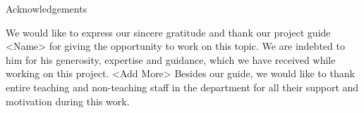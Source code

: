 
\newpage
\thispagestyle{empty}

\begin{center}
\LARGE Acknowledgements\\[2.5cm]
\end{center}
We would like to express our sincere gratitude and thank our project guide <Name> for giving the opportunity to work on this topic. We are indebted to him for his generosity, expertise and guidance, which we have received while working on this project. 
<Add More> 
Besides our guide, we would like to thank entire teaching and non-teaching staff in the department for all their support and motivation during this work.

\vfill
\clearpage